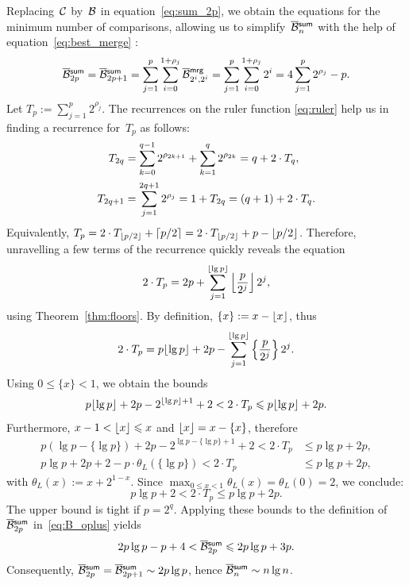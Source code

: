 Replacing~\(\mathcal{C}\) by~\(\mathcal{B}\) in equation~\eqref{eq:sum_2p}, we
obtain the equations for the minimum number of comparisons, allowing
us to simplify~\(\OB{\fun{sum}}{n}\)
with the help of equation~\eqref{eq:best_merge}
:
\begin{equation}
\OB{\fun{sum}}{2p}
  = \OB{\fun{sum}}{2p+1}
  = \sum_{j=1}^{p}\sum_{i=0}^{1+\rho_{j}}{\OB{\fun{mrg}}{2^i,2^i}}
  = \sum_{j=1}^{p}\sum_{i=0}^{1+\rho_{j}}{2^{i}}
  = 4\sum_{j=1}^{p}{2^{\rho_{j}}} - p.
\label{eq:B_oplus}
\end{equation}
Let \(T_p := \sum_{j=1}^{p}{2^{\rho_{j}}}\). The recurrences on the
ruler function \eqref{eq:ruler}
 help us in finding a recurrence for~\(T_p\) as
follows:
\begin{align*}
T_{2q} &= \sum_{k=0}^{\smash[t]{q-1}}{2^{\rho_{2k+1}}} +
\sum_{k=1}^{q}{2^{\rho_{2k}}} = q + 2 \cdot T_{q},\\[2mm]
T_{2q+1}
&= \sum_{j=1}^{\smash[t]{2q+1}}{2^{\rho_{j}}} = 1 + T_{2q} = (q + 1) +
2 \cdot T_{q}.
\end{align*}
Equivalently, \(T_{p} = 2 \cdot T_{\lfloor{p/2}\rfloor} + \lceil{p/2}\rceil = 2
\cdot T_{\lfloor{p/2}\rfloor} + p - \lfloor{p/2}\rfloor\). Therefore, unravelling a
few terms of the recurrence quickly reveals the equation
\begin{equation*}
2 \cdot T_p = 2p + \sum_{j=1}^{\lfloor{\lg p}\rfloor}
            {\left\lfloor{\frac{p}{2^j}}\right\rfloor 2^j},
\end{equation*}
using Theorem~\vref{thm:floors}. By definition, \(\{x\} := x -
\lfloor{x}\rfloor\), thus
\begin{equation*}
2 \cdot T_p = p\lfloor{\lg p}\rfloor + 2p - \sum_{j=1}^{\lfloor{\lg
    p}\rfloor}\left\lbrace\frac{p}{2^j}\right\rbrace 2^j.
\end{equation*}
Using \(0 \leqslant \{x\} < 1\), we obtain the bounds
\begin{equation*}
p\lfloor{\lg p}\rfloor + 2p - 2^{\lfloor{\lg p}\rfloor+1} + 2 < 2 \cdot T_p \leqslant
p\lfloor{\lg p}\rfloor + 2p.
\end{equation*}
Furthermore, \(x - 1 < \lfloor{x}\rfloor \leqslant x\) and \(\lfloor{x}\rfloor = x -
\{x\}\), therefore
\begin{align*}
p(\lg p - \{\lg p\}) + 2p - 2^{\lg p - \{\lg p\} +
  1} + 2 < 2 \cdot T_p &\leqslant p\lg p + 2p,\\
p\lg p + 2p + 2 - p \cdot \theta_L(\{\lg p\}) < 2 \cdot T_p
&\leqslant p\lg p + 2p,
\end{align*}
with \(\theta_L(x) := x + 2^{1 - x}\). Since \(\max_{0 \leqslant x <
  1}\theta_L(x) = \theta_L(0) = 2\), we conclude:
\begin{equation*}
p\lg p + 2 < 2 \cdot T_p \leqslant p\lg p + 2p.
\end{equation*}
The upper bound is tight if \(p=2^q\). Applying these bounds to the
definition of~\(\OB{\fun{sum}}{2p}\) in~\eqref{eq:B_oplus} yields
\begin{equation}
2p\lg p - p + 4 < \OB{\fun{sum}}{2p} \leqslant 2p\lg p + 3p.
\label{ineq:B_oplus_2p}
\end{equation}
Consequently, \(\OB{\fun{sum}}{2p} = \OB{\fun{sum}}{2p+1} \sim 2p\lg
p\), hence \(\OB{\fun{sum}}{n} \sim n\lg n\).

